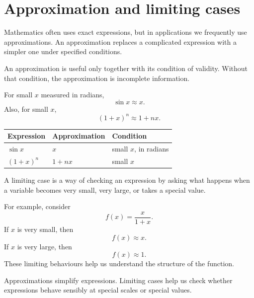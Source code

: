 \section{Approximation and limiting cases}

Mathematics often uses exact expressions, but in applications we frequently use approximations. An approximation replaces a complicated expression with a simpler one under specified conditions.

\begin{definitionbox}
An approximation is useful only together with its condition of validity. Without that condition, the approximation is incomplete information.
\end{definitionbox}

For small \(x\) measured in radians,
\[
\sin x \approx x.
\]
Also, for small \(x\),
\[
(1+x)^n \approx 1+nx.
\]

\begin{center}
\begin{tabular}{@{}lll@{}}
\toprule
Expression & Approximation & Condition \\
\midrule
\(\sin x\) & \(x\) & small \(x\), in radians \\
\((1+x)^n\) & \(1+nx\) & small \(x\) \\
\bottomrule
\end{tabular}
\end{center}

A limiting case is a way of checking an expression by asking what happens when a variable becomes very small, very large, or takes a special value.

For example, consider
\[
f(x)=\frac{x}{1+x}.
\]
If \(x\) is very small, then
\[
f(x)\approx x.
\]
If \(x\) is very large, then
\[
f(x)\approx 1.
\]
These limiting behaviours help us understand the structure of the function.

\begin{summarybox}
Approximations simplify expressions. Limiting cases help us check whether expressions behave sensibly at special scales or special values.
\end{summarybox}
